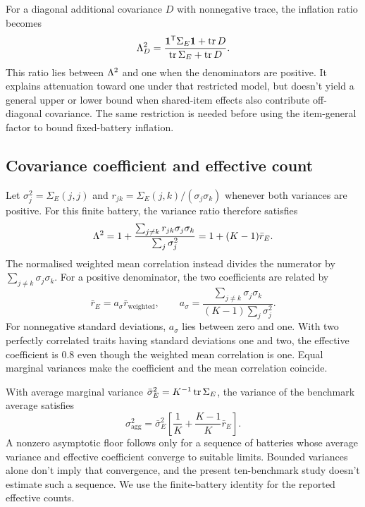 For a diagonal additional covariance $D$ with nonnegative trace, the inflation ratio becomes
\begin{equation}
\Lambda_D^2=\frac{\mathbf1^{\mathsf T}\Sigma_E\mathbf1+\operatorname{tr}D}
{\operatorname{tr}\Sigma_E+\operatorname{tr}D}.
\end{equation}
This ratio lies between $\Lambda^2$ and one when the denominators are positive. It explains attenuation toward one under that restricted model, but doesn't yield a general upper or lower bound when shared-item effects also contribute off-diagonal covariance. The same restriction is needed before using the item-general factor to bound fixed-battery inflation.

\subsection{Covariance coefficient and effective count}
Let $\sigma_j^2=\Sigma_E(j,j)$ and $r_{jk}=\Sigma_E(j,k)/(\sigma_j\sigma_k)$ whenever both variances are positive. For this finite battery, the variance ratio therefore satisfies
\begin{equation}
\Lambda^2=1+\frac{\sum_{j\ne k}r_{jk}\sigma_j\sigma_k}{\sum_j\sigma_j^2}
=1+(K-1)\bar r_E.
\end{equation}
The normalised weighted mean correlation instead divides the numerator by $\sum_{j\ne k}\sigma_j\sigma_k$. For a positive denominator, the two coefficients are related by
\begin{equation}
\bar r_E=a_\sigma\bar r_{\mathrm{weighted}},\qquad
a_\sigma=\frac{\sum_{j\ne k}\sigma_j\sigma_k}{(K-1)\sum_j\sigma_j^2}.
\end{equation}
For nonnegative standard deviations, $a_\sigma$ lies between zero and one. With two perfectly correlated traits having standard deviations one and two, the effective coefficient is 0.8 even though the weighted mean correlation is one. Equal marginal variances make the coefficient and the mean correlation coincide.

With average marginal variance $\bar\sigma_E^2=K^{-1}\operatorname{tr}\Sigma_E$, the variance of the benchmark average satisfies
\begin{equation}
\sigma_{\mathrm{agg}}^2=\bar\sigma_E^2\left[\frac1K+\frac{K-1}{K}\bar r_E\right].
\end{equation}
A nonzero asymptotic floor follows only for a sequence of batteries whose average variance and effective coefficient converge to suitable limits. Bounded variances alone don't imply that convergence, and the present ten-benchmark study doesn't estimate such a sequence. We use the finite-battery identity for the reported effective counts.

